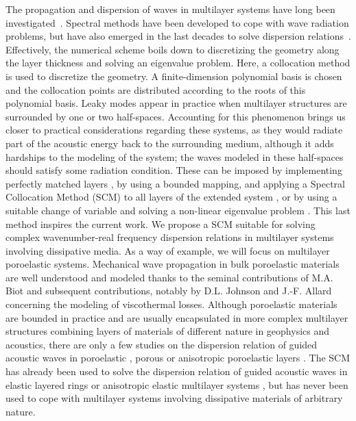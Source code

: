 The propagation and dispersion of waves in multilayer systems have long been investigated~\cite{lowe1995,haskell1953}.  Spectral methods have been developed to cope with wave radiation problems, but have also emerged in the last decades to solve dispersion relations~\cite{pagneux2001}. Effectively, the numerical scheme boils down to discretizing the geometry along the layer thickness and solving an eigenvalue problem. Here, a collocation method is used to discretize the geometry. A finite-dimension polynomial basis is chosen and the collocation points are distributed according to the roots of this polynomial basis. Leaky modes appear in practice when multilayer structures are surrounded by one or two half-spaces. Accounting for this phenomenon brings us closer to practical considerations regarding these systems, as they would radiate part of the acoustic energy back to the surrounding medium, although it adds hardships to the modeling of the system; the waves modeled in these half-spaces should satisfy some radiation condition. These can be imposed by implementing perfectly matched layers \cite{gallezot2017}, by using a bounded mapping, and applying a Spectral Collocation Method (SCM) to all layers of the extended system \cite{georgiades2022}, or by using a suitable change of variable and solving a non-linear eigenvalue problem \cite{kiefer2019}. This last method inspires the current work. We propose a SCM suitable for solving complex wavenumber-real frequency dispersion relations in multilayer systems involving dissipative media. As a way of example, we will focus on multilayer poroelastic systems. Mechanical wave propagation in bulk poroelastic materials are well understood and modeled thanks to the seminal contributions of M.A. Biot \cite{biot1956,biot1956a,biot1962,biot1962a} and subsequent contributions, notably by D.L. Johnson \etal \cite{johnson1987} and J.-F. Allard \etal \cite{champoux1991,lafarge1997} concerning the modeling of viscothermal losses. Although poroelastic materials are bounded in practice and are usually encapsulated in more complex multilayer structures combining layers of materials of different nature in geophysics and acoustics, there are only a few studies on the dispersion relation of guided acoustic waves in poroelastic \cite{weisser2016, boeckx2005, belloncle2003}, porous \cite{allard2004,groby2008a} or anisotropic poroelastic layers \cite{seyfaddini2021}. The SCM has already been used to solve the dispersion relation of guided acoustic waves in elastic layered rings \cite{adamou2004, karpfinger2008} or anisotropic elastic multilayer systems \cite{quintanilla2015}, but has never been used to cope with multilayer systems involving dissipative materials of arbitrary nature. 
    
